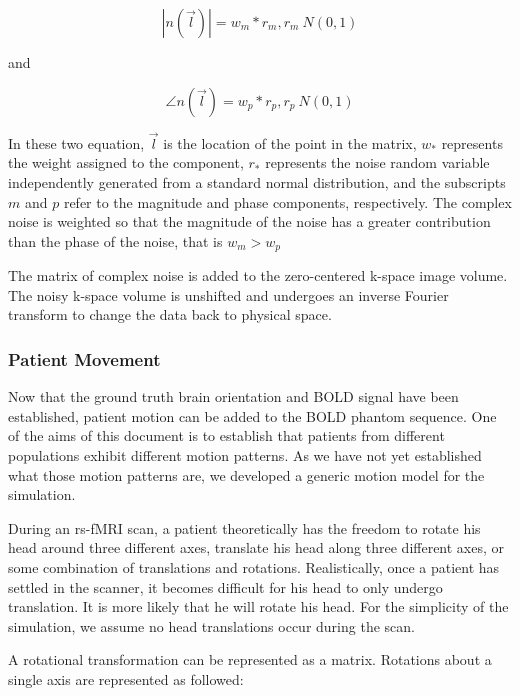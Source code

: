 \begin{equation}
|n(\vec{l})| = w_m * r_m, r_m~N(0,1)
\end{equation}

\noindent and

\begin{equation}
\angle n(\vec{l}) = w_p * r_p, r_p~N(0,1)
\end{equation}

\noindent In these two equation, $\vec{l}$ is the location of the point in the matrix, $w_*$ represents the weight assigned to the component, $r_*$ represents the noise random variable independently generated from a standard normal distribution, and the subscripts $m$ and $p$ refer to the magnitude and phase components, respectively. The complex noise is weighted so that the magnitude of the noise has a greater contribution than the phase of the noise, that is $w_m > w_p$ 

The matrix of complex noise is added to the zero-centered k-space image volume. The noisy k-space volume is unshifted and undergoes an inverse Fourier transform to change the data back to physical space.

\subsubsection{Patient Movement}

Now that the ground truth brain orientation and BOLD signal have been established, patient motion can be added to the BOLD phantom sequence. One of the aims of this document is to establish that patients from different populations exhibit different motion patterns. As we have not yet established what those motion patterns are, we developed a generic motion model for the simulation.

During an rs-fMRI scan, a patient theoretically has the freedom to rotate his head around three different axes, translate his head along three different axes, or some combination of translations and rotations. Realistically, once a patient has settled in the scanner, it becomes difficult for his head to only undergo translation. It is more likely that he will rotate his head. For the simplicity of the simulation, we assume no head translations occur during the scan.

A rotational transformation can be represented as a matrix. Rotations about a single axis are represented as followed:

